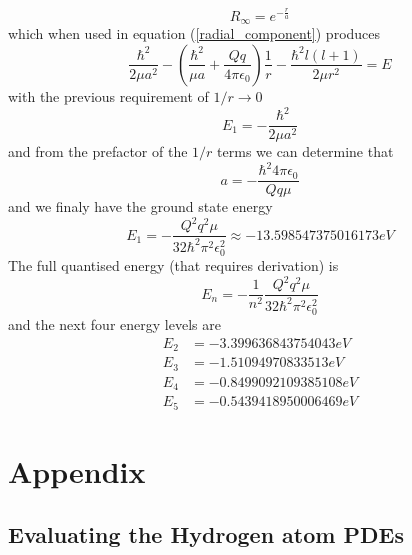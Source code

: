 \documentclass[12pt,a4paper]{report}
\begin{document}
	\begin{equation}
		R_\infty = e^{-\frac{r}{a}}
	\end{equation}
	which when used in equation (\ref{radial_component}) produces
	\begin{equation}
		\frac{\hbar^2}{2\mu a^2}-\left(\frac{\hbar^2}{\mu a}+\frac{Qq}{4\pi \epsilon_0}\right)\frac{1}{r}-\frac{\hbar^2 l\left(l+1\right)}{2\mu r^2}=E
	\end{equation}
	with the previous requirement of $1/r \rightarrow 0$
	\begin{equation}
		E_1=-\frac{\hbar^2}{2\mu a^2}
	\end{equation}
	and from the prefactor of the $1/r$ terms we can determine that 
	\begin{equation}
		a=-\frac{\hbar^2 4\pi\epsilon_0}{Qq\mu}
	\end{equation}
	and we finaly have the ground state energy 
	\begin{equation}
		E_1=-\frac{Q^2 q^2 \mu}{32\hbar^2 \pi^2 \epsilon_0^2} \approx -13.598547375016173 eV
	\end{equation}
	The full quantised energy (that requires derivation) is 
	\begin{equation}
		E_n=-\frac{1}{n^2}\frac{Q^2 q^2 \mu}{32\hbar^2 \pi^2 \epsilon_0^2}
	\end{equation}
	and the next four energy levels are 
	\begin{align}
		E_2&=-3.399636843754043eV\\
		E_3&=-1.51094970833513eV\\
		E_4&=-0.8499092109385108eV\\
		E_5&=-0.5439418950006469eV
	\end{align}


\chapter{Appendix}
\label{Appendix}

\section{Evaluating the Hydrogen atom PDEs}
\label{Evaluating the Hydrogen atom PDEs}
\end{document}
